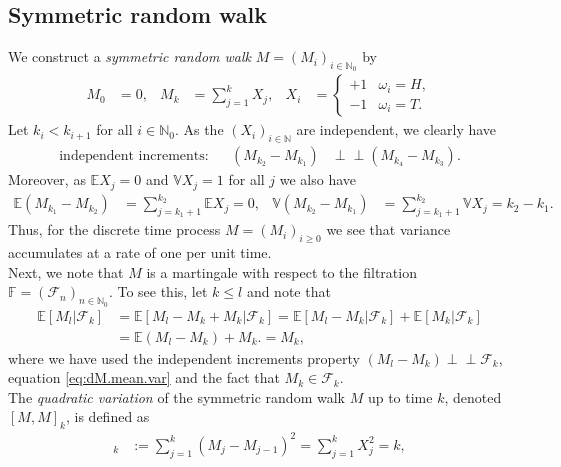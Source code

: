\documentclass[12pt]{book}
\numberwithin{equation}{chapter}
\theoremstyle{plain}
\numberwithin{theorem}{section}
\theoremstyle{definition}
\numberwithin{exercise}{chapter}
\newcommand{\<}{\langle}
\renewcommand{\>}{\rangle}
\renewcommand{\(}{\left(}
\renewcommand{\)}{\right)}
\renewcommand{\[}{\left[}
\renewcommand{\]}{\right]}
\newcommand\Eb{\mathds{E}}
\newcommand\Fb{\mathds{F}}
\newcommand\Nb{\mathds{N}}
\newcommand\Vb{\mathds{V}}
\newcommand\Fc{\mathscr{F}}
\newcommand\om{\omega}
\newcommand{\ind}{\perp \! \! \! \perp}
\begin{document}
\subsection{Symmetric random walk}
We construct a \emph{symmetric random walk} $M = (M_i)_{i \in \Nb_0}$ by
\begin{align}
M_0
	&=	0 , &
M_k
	&=	\sum_{j=1}^k X_j , &
X_i
	&=	\left\{ \begin{array}{ll}
			+1 & \om_i = H , \\
			-1 & \om_i = T .
			\end{array} \right.
\end{align}
Let $k_{i} < k_{i+1}$ for all $i \in \Nb_0$.  As the $(X_i)_{i \in \Nb}$ are independent, we clearly have
\begin{align}
\text{independent increments}:&&
(M_{k_2} - M_{k_1})
	&\ind (M_{k_4} - M_{k_3}) .
\end{align}
Moreover, as $\Eb X_j = 0$ and $\Vb X_j = 1$ for all $j$ we also have
\begin{align}
\Eb (M_{k_1} - M_{k_2})
	&=	\sum_{j=k_1+1}^{k_2} \Eb X_j
	=	0 , &
\Vb (M_{k_2} - M_{k_1})
	&=	\sum_{j=k_1+1}^{k_2} \Vb X_j
	=	k_2 - k_1 . \label{eq:dM.mean.var}
\end{align}
Thus, for the discrete time process $M = (M_i)_{i \geq 0}$ we see that variance accumulates at a rate of one per unit time.
\\[0.5em]
Next, we note that $M$ is a martingale with respect to the filtration $\Fb = (\Fc_n)_{n \in \Nb_0}$.  To see this, let $k \leq l$ and note that
\begin{align}
\Eb[ M_l | \Fc_k ]
	&= 	\Eb[ M_l - M_k + M_k | \Fc_k ]	
	= 	\Eb[ M_l - M_k | \Fc_k ] + \Eb[ M_k | \Fc_k ] \\
	&= 	\Eb ( M_l - M_k ) +  M_k .
	=		M_k ,
\end{align}
where we have used the independent increments property $(M_l - M_k) \ind \Fc_k$, equation \eqref{eq:dM.mean.var} and the fact that $M_k \in \Fc_k$.
\\[0.5em]
The \emph{quadratic variation} of 
the symmetric random walk $M$ up to time $k$, denoted $[M,M]_k$, is defined as
\begin{align}
[M,M]_k
	&:=	\sum_{j=1}^k (M_j - M_{j-1} )^2
	=		\sum_{j=1}^k X_j^2
	=		k ,
\end{align}
\end{document}
